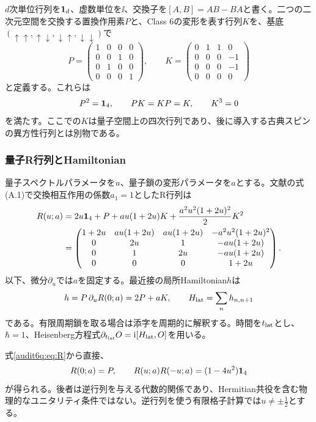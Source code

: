 $d$次単位行列を$\mathbf 1_{d}$、虚数単位を$\ii$、交換子を$[A,B]=AB-BA$と書く。二つの二次元空間を交換する置換作用素$P$と、Class 6の変形を表す行列$K$を、基底$(\uparrow\uparrow,\uparrow\downarrow,\downarrow\uparrow,\downarrow\downarrow)$で
\begin{equation}
P=\begin{pmatrix}1&0&0&0\\0&0&1&0\\0&1&0&0\\0&0&0&1\end{pmatrix},\qquad
K=\begin{pmatrix}0&1&1&0\\0&0&0&-1\\0&0&0&-1\\0&0&0&0\end{pmatrix}
\label{audit6q:eq:PK}
\end{equation}
と定義する。これらは
\begin{equation}
P^2=\mathbf 1_{4},\qquad PK=KP=K,\qquad K^3=0
\label{audit6q:eq:PKalgebra}
\end{equation}
を満たす。ここでの$K$は量子空間上の四次行列であり、後に導入する古典スピンの異方性行列とは別物である。

\subsubsection{量子R行列とHamiltonian}
量子スペクトルパラメータを$u$、量子鎖の変形パラメータを$a$とする。文献\cite{DFN}の式(A.1)で交換相互作用の係数$a_1=1$としたR行列は
\begin{align}
R(u;a)&=2u\mathbf 1_{4}+P+a u(1+2u)K
 +\frac{a^2u^2(1+2u)^2}{2}K^2
\label{audit6q:eq:R}\\
&=\begin{pmatrix}
1+2u&au(1+2u)&au(1+2u)&-a^2u^2(1+2u)^2\\
0&2u&1&-au(1+2u)\\
0&1&2u&-au(1+2u)\\
0&0&0&1+2u
\end{pmatrix}.
\end{align}
以下、微分$\partial_u$では$a$を固定する。最近接の局所Hamiltonian$h$は
\begin{equation}
h=P\,\partial_uR(0;a)=2P+aK,
\qquad H_{\rm lat}=\sum_n h_{n,n+1}
\label{audit6q:eq:hlat}
\end{equation}
である。有限周期鎖を取る場合は添字を周期的に解釈する。時間を$t_{\rm lat}$とし、$\hbar=1$、Heisenberg方程式$\partial_{t_{\rm lat}}O=\mathrm i[H_{\rm lat},O]$を用いる。

式\eqref{audit6q:eq:R}から直接、
\begin{equation}
R(0;a)=P,\qquad
R(u;a)R(-u;a)=(1-4u^2)\mathbf 1_{4}
\label{audit6q:eq:inverse}
\end{equation}
が得られる。後者は逆行列を与える代数的関係であり、Hermitian共役を含む物理的なユニタリティ条件ではない。逆行列を使う有限格子計算では$u\ne\pm\tfrac12$とする。

